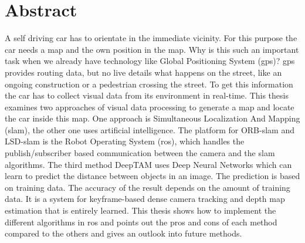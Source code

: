 

\chapter*{Abstract}
A self driving car has to orientate in the immediate vicinity. For this purpose the car needs a map and the own position in the map. Why is this such an important task when we already have technology like Global Positioning System (\gls{gps})? \gls{gps} provides routing data, but no live details what happens on the street, like an ongoing construction or a pedestrian crossing the street. To get this information the car has to collect visual data from its environment in real-time. This thesis examines two approaches of visual data processing to generate a map and locate the car inside this map. One approach is Simultaneous Localization And Mapping  (\gls{slam}), the other one uses artificial intelligence. The platform for ORB-\gls{slam} and LSD-\gls{slam} is the Robot Operating System (\gls{ros}), which handles the publish/subscriber based communication between the camera and the \gls{slam} algorithms. The third method DeepTAM uses Deep Neural Networks which can learn to predict the distance between objects in an image. The prediction is based on training data. The accuracy of the result depends on the amount of training data. It is a system for keyframe-based dense camera tracking and depth map estimation that is entirely learned. This thesis shows how to implement the different algorithms in \gls{ros} and points out the pros and cons of each method compared to the others and gives an outlook into future methods.
\newline
\newline
\newline
\newline
